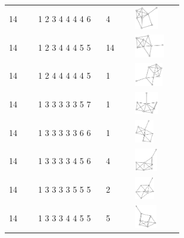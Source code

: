 \begin{table}[h!]
\begin{tabular}{m{0.15\linewidth} m{0.35\linewidth} m{0.15\linewidth} m{0.25\linewidth}}
14 & 1 2 3 4 4 4 4 6 & 4 & \includegraphics[height=1cm]{15-universal-graphs/img/degree-sequences-example-graphs/graph-4-8-71}\\
14 & 1 2 3 4 4 4 5 5 & 14 & \includegraphics[height=1cm]{15-universal-graphs/img/degree-sequences-example-graphs/graph-4-8-72}\\
14 & 1 2 4 4 4 4 4 5 & 1 & \includegraphics[height=1cm]{15-universal-graphs/img/degree-sequences-example-graphs/graph-4-8-73}\\
14 & 1 3 3 3 3 3 5 7 & 1 & \includegraphics[height=1cm]{15-universal-graphs/img/degree-sequences-example-graphs/graph-4-8-74}\\
14 & 1 3 3 3 3 3 6 6 & 1 & \includegraphics[height=1cm]{15-universal-graphs/img/degree-sequences-example-graphs/graph-4-8-75}\\
14 & 1 3 3 3 3 4 5 6 & 4 & \includegraphics[height=1cm]{15-universal-graphs/img/degree-sequences-example-graphs/graph-4-8-76}\\
14 & 1 3 3 3 3 5 5 5 & 2 & \includegraphics[height=1cm]{15-universal-graphs/img/degree-sequences-example-graphs/graph-4-8-77}\\
14 & 1 3 3 3 4 4 5 5 & 5 & \includegraphics[height=1cm]{15-universal-graphs/img/degree-sequences-example-graphs/graph-4-8-78}\\

\end{tabular}
\end{table}
